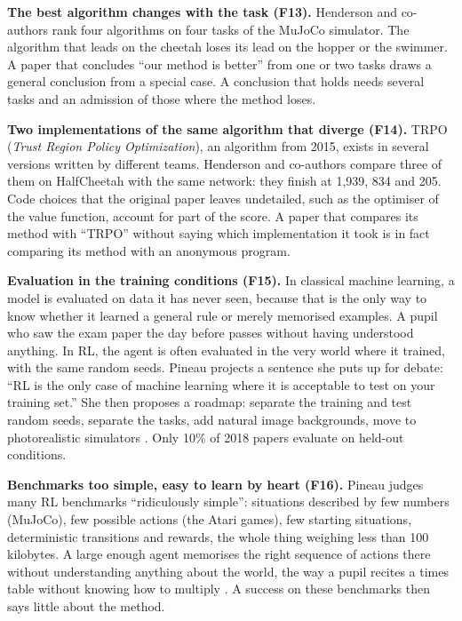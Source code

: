 \documentclass[11pt,a4paper]{article}
\begin{document}
\textbf{The best algorithm changes with the task (F13).} Henderson and
co-authors rank four algorithms on four tasks of the MuJoCo simulator.
The algorithm that leads on the cheetah loses its lead on the hopper or
the swimmer. A paper that concludes ``our method is better'' from one or
two tasks draws a general conclusion from a special case. A conclusion
that holds needs several tasks and an admission of those where the
method loses.

\textbf{Two implementations of the same algorithm that diverge (F14).}
TRPO (\emph{Trust Region Policy Optimization}), an algorithm from 2015,
exists in several versions written by different teams. Henderson and
co-authors compare three of them on HalfCheetah with the same network:
they finish at 1,939, 834 and 205. Code choices that the original paper
leaves undetailed, such as the optimiser of the value function, account
for part of the score. A paper that compares its method with ``TRPO''
without saying which implementation it took is in fact comparing its
method with an anonymous program.

\textbf{Evaluation in the training conditions (F15).} In classical
machine learning, a model is evaluated on data it has never seen,
because that is the only way to know whether it learned a general rule
or merely memorised examples. A pupil who saw the exam paper the day
before passes without having understood anything. In RL, the agent is
often evaluated in the very world where it trained, with the same random
seeds. Pineau projects a sentence she puts up for debate: ``RL is the
only case of machine learning where it is acceptable to test on your
training set.'' She then proposes a roadmap: separate the training and
test random seeds, separate the tasks, add natural image backgrounds,
move to photorealistic simulators
\autocite{zhang2018dissection,zhang2018natural}. Only 10\% of 2018
papers evaluate on held-out conditions.

\textbf{Benchmarks too simple, easy to learn by heart (F16).} Pineau
judges many RL benchmarks ``ridiculously simple'': situations described
by few numbers (MuJoCo), few possible actions (the Atari games), few
starting situations, deterministic transitions and rewards, the whole
thing weighing less than 100 kilobytes. A large enough agent memorises
the right sequence of actions there without understanding anything about
the world, the way a pupil recites a times table without knowing how to
multiply \autocite{machado2018revisiting}. A success on these benchmarks
then says little about the method.
\end{document}
